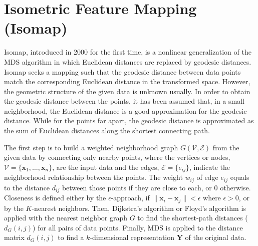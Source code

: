 \section{Isometric Feature Mapping (Isomap)\label{Sec:DR:Isomap}}
Isomap, introduced in 2000 for the first time, is a nonlinear generalization of the MDS algorithm in which Euclidean distances are replaced by geodesic distances.\cite{TenenhaumScience2000} Isomap seeks a mapping such that the geodesic distance between data points match the corresponding Euclidean distance in the transformed space. However, the geometric structure of the given data is unknown usually. In order to obtain the geodesic distance between the points, it has been assumed that, in a small neighborhood, the Euclidean distance is a good approximation for the geodesic distance. While for the points far apart, the geodesic distance is approximated as the sum of Euclidean distances along the shortest connecting path.

The first step is to build a weighted neighborhood graph $G(\mathcal{V},\mathcal{E})$ from the given data by connecting only nearby points, where the vertices or nodes, $\mathcal{V}=\{\mathbf{x}_1,\dots,\mathbf{x}_n\}$, are the input data and the edges, $\mathcal{E}=\{e_{ij}\}$, indicate the neighborhood relationship between the points. The weight $w_{ij}$ of edge $e_{ij}$ equals to the distance $d_{ij}$ between those points if they are close to each, or $0$ otherwise. Closeness is defined either by the $\epsilon$-approach, if $\lVert\mathbf{x}_i-\mathbf{x}_j\rVert<\epsilon$ where $\epsilon >0$, or by the $K$-nearest neighbors. Then, Dijkstra’s algorithm or Floyd's algorithm is applied with the nearest neighbor graph $G$ to find the shortest-path distances ($d_G(i,j)$) for all pairs of data points. Finally, MDS is applied to the distance matrix $d_G(i,j)$ to find a $k$-dimensional representation $\mathbf{Y}$ of the original data.